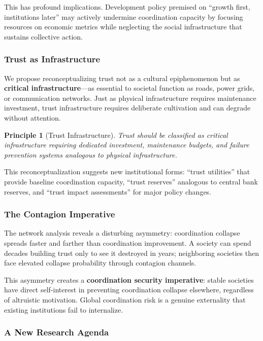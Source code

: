 \documentclass[12pt,a4paper]{article}
\newtheorem{principle}{Principle}
\begin{document}
This has profound implications. Development policy premised on ``growth first, institutions later'' may actively undermine coordination capacity by focusing resources on economic metrics while neglecting the social infrastructure that sustains collective action.

\subsubsection{Trust as Infrastructure}

We propose reconceptualizing trust not as a cultural epiphenomenon but as \textbf{critical infrastructure}---as essential to societal function as roads, power grids, or communication networks. Just as physical infrastructure requires maintenance investment, trust infrastructure requires deliberate cultivation and can degrade without attention.

\begin{principle}[Trust Infrastructure]
Trust should be classified as critical infrastructure requiring dedicated investment, maintenance budgets, and failure prevention systems analogous to physical infrastructure.
\end{principle}

This reconceptualization suggests new institutional forms: ``trust utilities'' that provide baseline coordination capacity, ``trust reserves'' analogous to central bank reserves, and ``trust impact assessments'' for major policy changes.

\subsubsection{The Contagion Imperative}

The network analysis reveals a disturbing asymmetry: coordination collapse spreads faster and farther than coordination improvement. A society can spend decades building trust only to see it destroyed in years; neighboring societies then face elevated collapse probability through contagion channels.

This asymmetry creates a \textbf{coordination security imperative}: stable societies have direct self-interest in preventing coordination collapse elsewhere, regardless of altruistic motivation. Global coordination risk is a genuine externality that existing institutions fail to internalize.

\subsubsection{A New Research Agenda}
\end{document}
